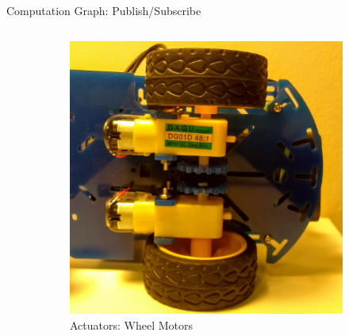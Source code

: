 \documentclass[aspectratio=43]{beamer}
\begin{document}
\begin{frame}{Computation Graph: Publish/Subscribe}
\begin{columns}[T]
\begin{column}{0.5\textwidth}
{\begin{figure}
				\begin{subfigure}
					\centering
					\includegraphics[width=\textwidth,height=0.3\textheight,keepaspectratio]{dot/wheels.jpg}\\
					Actuators: Wheel Motors
				\end{subfigure}
			\end{figure}
			}
\end{column}
\end{columns}
\end{frame}
\end{document}

